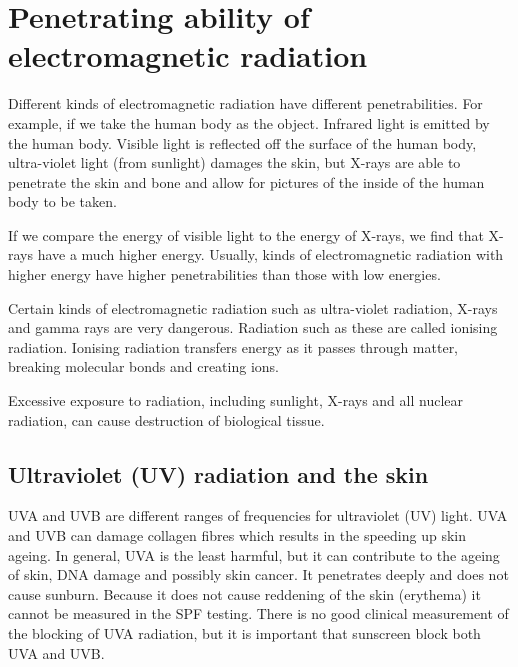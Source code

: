 \section{Penetrating ability of electromagnetic radiation}
\label{p:em:emr12:pa}

Different kinds of electromagnetic radiation have different penetrabilities. For example, if we take the human body as the object. Infrared light is emitted by the human body. Visible light is reflected off the surface of the human body, ultra-violet light (from sunlight) damages the skin, but X-rays are able to penetrate the skin and bone and allow for pictures of the inside of the human body to be taken.

If we compare the energy of visible light to the energy of X-rays, we find that X-rays have a much higher energy. Usually, kinds of electromagnetic radiation with higher energy have higher penetrabilities than those with low energies.

Certain kinds of electromagnetic radiation such as ultra-violet radiation, X-rays and gamma rays are very dangerous. Radiation such as these are called ionising radiation. Ionising radiation transfers energy as it passes through matter, breaking molecular bonds and creating ions.
 
Excessive exposure to radiation, including sunlight, X-rays and all nuclear radiation, can cause destruction of biological tissue. 

\vspace{-0.5cm}

\subsection{Ultraviolet (UV) radiation and the skin}
UVA and UVB are different ranges of frequencies for ultraviolet (UV) light. UVA and UVB can damage collagen fibres which results in the speeding up skin ageing. In general, UVA is the least harmful, but it  can contribute to the ageing of skin, DNA damage and possibly skin cancer. It penetrates deeply and does not cause sunburn. Because it does not cause reddening of the skin (erythema) it cannot be measured in the SPF testing. There is no good clinical measurement of the blocking of UVA radiation, but it is important that sunscreen block both UVA and UVB.

